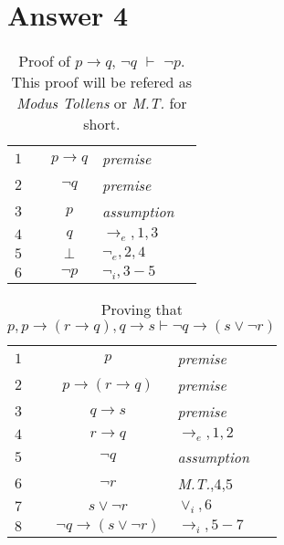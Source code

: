 \documentclass[12pt]{article}
\begin{document}
\section*{Answer 4}

\begin{table}[H]
	\centering
		\caption{Proof of  $p\rightarrow q$, $ \neg q$ $\vdash$ $\neg p$. This proof will be refered as \textit{Modus Tollens} or \textit{M.T.} for short.}
		\vspace{0.5cm}
	\begin{tabular}{llcll}
		$1$ & & $p \rightarrow q$ & \textit{premise}&\\
		$2$ & & $\neg q$ & \textit{premise} & \\ \cline{2-5}
		$3$ & \multicolumn{1}{|c}{} & $p$ & \textit{assumption} & \multicolumn{1}{c|}{}\\
		$4$ & \multicolumn{1}{|c}{} & $q$ & $\rightarrow _e,1,3$ & \multicolumn{1}{c|}{}\\
		$5$ & \multicolumn{1}{|c}{} & $\bot$ & $\neg _e,2,4$ & \multicolumn{1}{c|}{}\\\cline{2-5}
		$6$ & & $\neg p$ & $\neg _i,3-5$ &\\
	\end{tabular}
	
\end{table}
\begin{table}[H]
	\centering
	\caption{Proving that $p, p \rightarrow (r \rightarrow q), q \rightarrow
	s \vdash \neg q \rightarrow (s \lor \neg r)$}
	\vspace{0.5cm}
	\begin{tabular}{llcll}
		$1$ & & $p$ & \textit{premise} &\\
		$2$ & & $p \rightarrow (r\rightarrow q)$ & \textit{premise} &\\
		$3$ & & $q\rightarrow s$ & \textit{premise} & \\
		$4$ & & $r\rightarrow q$ & $\rightarrow _e,1,2$ &\\\cline{2-5}
		$5$ & \multicolumn{1}{|c}{} & $ \neg q $ & \textit{assumption} & \multicolumn{1}{c|}{}\\
		$6$ & \multicolumn{1}{|c}{} & $\neg r$ & \textit{M.T.},4,5 & \multicolumn{1}{c|}{}\\
		$7$ & \multicolumn{1}{|c}{} & $s\lor\neg r $ & $\lor _i,6$ & \multicolumn{1}{c|}{}\\\cline{2-5}
		$8$ & & $\neg q \rightarrow (s \lor \neg r)$ & $\rightarrow _i,5-7$ &\\
			
	\end{tabular}
\end{table}
\newpage
\end{document}
